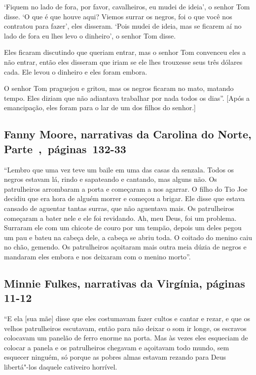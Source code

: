 `Fiquem no lado de fora, por favor, cavalheiros, eu mudei de ideia', o
senhor Tom disse. `O que é que houve aqui? Viemos surrar os negros, foi
o que você nos contratou para fazer', eles disseram. `Pois mudei de
ideia, mas se ficarem aí no lado de fora eu lhes levo o dinheiro', o
senhor Tom disse.

Eles ficaram discutindo que queriam entrar, mas o senhor Tom convenceu
eles a não entrar, então eles disseram que iriam se ele lhes trouxesse
seus três dólares cada. Ele levou o dinheiro e eles foram embora.

O senhor Tom praguejou e gritou, mas os negros ficaram no mato, matando
tempo. Eles diziam que não adiantava trabalhar por nada todos os dias''.
{[}Após a emancipação, eles foram para o lar de um dos filhos do
senhor.{]}

\subsection{Fanny Moore, narrativas da Carolina do Norte, Parte~,~páginas~132-33}
\label{ref195}

``Lembro que uma vez teve um baile em uma das casas da senzala. Todos os
negros estavam lá, rindo e sapateando e cantando, mas alguns não. Os
patrulheiros arrombaram a porta e começaram a nos agarrar. O filho do
Tio Joe decidiu que era hora de alguém morrer e começou a brigar. Ele
disse que estava cansado de aguentar tantas surras, que não aguentava
mais. Os patrulheiros começaram a bater nele e ele foi revidando. Ah,
meu Deus, foi um problema. Surraram ele com um chicote de couro por um
tempão, depois um deles pegou um pau e bateu na cabeça dele, a cabeça se
abriu toda. O coitado do menino caiu no chão, gemendo. Os patrulheiros
açoitaram mais outra meia dúzia de negros e mandaram eles embora e nos
deixaram com o menino morto''.

\subsection{Minnie Fulkes, narrativas da Virgínia, páginas 11-12} \label{ref96}

``E ela {[}sua mãe{]} disse que eles costumavam fazer cultos e cantar e
rezar, e que os velhos patrulheiros escutavam, então para não deixar o
som ir longe, os escravos colocavam um panelão de ferro enorme na porta.
Mas às vezes eles esqueciam de colocar a panela e os patrulheiros
chegavam e açoitavam todo mundo, sem esquecer ninguém, só porque as
pobres almas estavam rezando para Deus libertá"-los daquele cativeiro
horrível.

